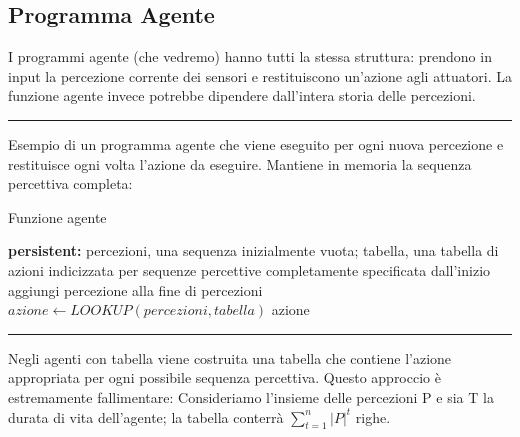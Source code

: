 \documentclass{article}
\begin{document}
\subsection{Programma Agente}
I programmi agente (che vedremo) hanno tutti la stessa struttura: prendono in input la percezione corrente dei sensori e restituiscono un'azione agli attuatori. La funzione agente invece potrebbe dipendere dall'intera storia delle percezioni.\newline

\par\noindent\rule{\textwidth}{0.4pt}
\noindent Esempio di un programma agente che viene eseguito per ogni nuova percezione e restituisce ogni volta l'azione da eseguire. Mantiene in memoria la sequenza percettiva completa:
\begin{center}
\begin{algorithm}
\caption{Funzione agente}
\textbf{persistent: }percezioni, una sequenza inizialmente vuota; tabella, una tabella di azioni indicizzata per sequenze percettive completamente specificata dall'inizio\;
aggiungi percezione alla fine di percezioni\;
$azione \leftarrow LOOKUP(percezioni, tabella)$\;
\Return azione\;
\end{algorithm}
\end{center}
\par\noindent\rule{\textwidth}{0.4pt}
\noindent Negli agenti con tabella viene costruita una tabella che contiene l'azione appropriata per ogni possibile sequenza percettiva.
Questo approccio è estremamente fallimentare:
Consideriamo l'insieme delle percezioni P e sia T la durata di vita dell'agente; la tabella conterrà $\sum_{t=1}^n|P|^t$ righe.
\newpage
\end{document}
